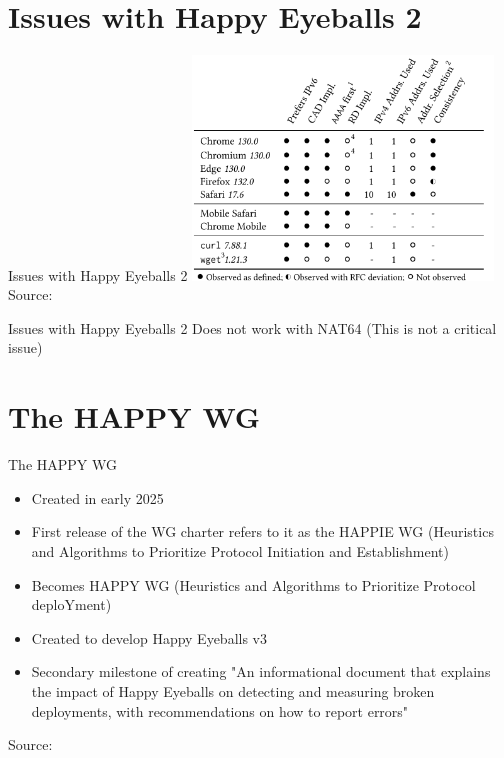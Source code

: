 \documentclass[aspectratio=169]{beamer}
\begin{document}
\section{Issues with Happy Eyeballs 2}
\begin{frame}{Issues with Happy Eyeballs 2}
  \centering
  \includegraphics[width=0.6\textwidth]{impl3.png}
  \\
  {\tiny Source: \parencite{sattlerLazyEyeInspection2025}}
\end{frame}


\begin{frame}{Issues with Happy Eyeballs 2}
  \centering
  Does not work with NAT64 (This is not a critical issue) 
\end{frame}

\section{The HAPPY WG}
\begin{frame}{The HAPPY WG}
  \begin{itemize}
    \item Created in early 2025
    \item First release of the WG charter refers to it as the HAPPIE WG (Heuristics and Algorithms to Prioritize Protocol Initiation and Establishment)
    \item Becomes HAPPY WG (Heuristics and Algorithms to Prioritize Protocol deploYment)
    \item Created to develop Happy Eyeballs v3
    \item Secondary milestone of creating "An informational document that explains the impact of Happy Eyeballs on detecting and measuring broken deployments, with recommendations on how to report errors"
  \end{itemize}
  \centering
  {\tiny Source: \parencite{HeuristicsAlgorithmsPrioritize}}
\end{frame}
\end{document}
